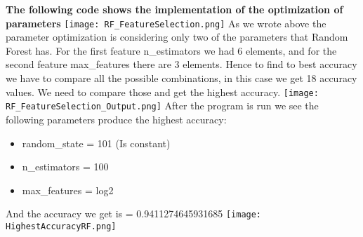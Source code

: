 \documentclass{article}
\begin{document}
\textbf{The following code shows the implementation of the optimization of parameters}
 \vspace{1cm}
 \centering
\texttt{[image: RF\_FeatureSelection.png]}
 \vspace{1cm}
 As we wrote above the parameter optimization is considering only two of the parameters that Random Forest has. For the first feature n\_estimators we had 6 elements, and for the second feature max\_features there are 3 elements. Hence to find to best accuracy we have to compare all the possible combinations, in this case we get 18 accuracy values. We need to compare those and get the highest accuracy. 
\texttt{[image: RF\_FeatureSelection\_Output.png]}
 \vspace{1cm}
 After the program is run we see the following parameters produce the highest accuracy:
 \begin{itemize}
     \item random\_state = 101 (Is constant)
     \item n\_estimators = 100
     \item max\_features = log2
 \end{itemize}
And the accuracy we get is = 0.9411274645931685
\texttt{[image: HighestAccuracyRF.png]}
\end{document}
